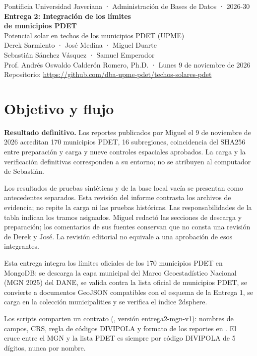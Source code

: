 \documentclass[11pt,a4paper]{article}
\newcommand{\brkus}{\textunderscore\allowbreak}
\newcommand{\f}[1]{{\ttfamily\let\_\brkus #1}}
\begin{document}
\begin{center}
  {\small Pontificia Universidad Javeriana · Administración de Bases de Datos · 2026-30}\\[0.9em]
  {\LARGE\bfseries\color{acento} Entrega 2: Integración de los límites\\[0.2em] de municipios PDET}\\[0.8em]
  {\large Potencial solar en techos de los municipios PDET (UPME)}\\[0.8em]
  Derek Sarmiento · José Medina · Miguel Duarte\\
  Sebastián Sánchez Vásquez · Samuel Emperador\\[0.3em]
  {\small Prof. Andrés Oswaldo Calderón Romero, Ph.D. · Lunes 9 de noviembre de 2026}\\[0.3em]
  {\small Repositorio: \url{https://github.com/dba-upme-pdet/techos-solares-pdet}}
\end{center}

\section{Objetivo y flujo}

\textbf{Resultado definitivo.} Los reportes publicados por Miguel el 9 de noviembre de 2026 acreditan 170 municipios PDET, 16 subregiones, coincidencia del SHA256 entre preparación y carga y nueve controles espaciales aprobados. La carga y la verificación definitivas corresponden a su entorno; no se atribuyen al computador de Sebastián.

Los resultados de pruebas sintéticas y de la base local vacía se presentan como antecedentes separados. Esta revisión del informe contrasta los archivos de evidencia; no repite la carga ni las pruebas históricas. Las responsabilidades de la tabla indican los tramos asignados. Miguel redactó las secciones de descarga y preparación; los comentarios de sus fuentes conservan que no consta una revisión de Derek y José. La revisión editorial no equivale a una aprobación de esos integrantes.

Esta entrega integra los límites oficiales de los 170 municipios PDET en MongoDB: se descarga la capa municipal del Marco Geoestadístico Nacional (MGN 2025) del DANE, se valida contra la lista oficial de municipios PDET, se convierte a documentos GeoJSON compatibles con el esquema de la Entrega 1, se carga en la colección \f{municipalities} y se verifica el índice \f{2dsphere}.

Los scripts comparten un contrato (, versión \f{entrega2-mgn-v1}): nombres de campos, CRS, regla de códigos DIVIPOLA y formato de los reportes en . El cruce entre el MGN y la lista PDET es siempre por código DIVIPOLA de 5 dígitos, nunca por nombre.
\end{document}
